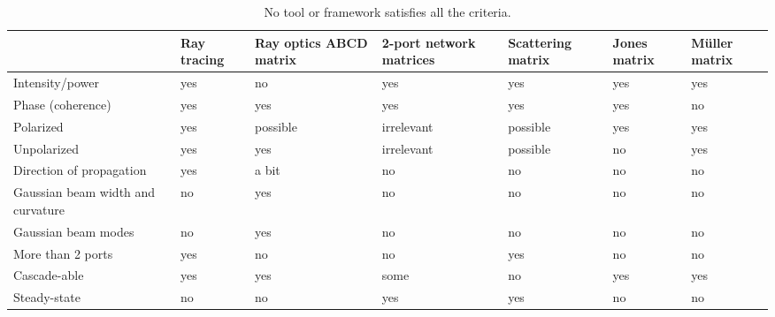 \begin{table}
    \centering
    {\footnotesize
    \begin{tabularx}{\textwidth}{X|X X X X X X}
        \toprule
                                          & Ray tracing & Ray optics ABCD matrix & 2-port network matrices & Scattering matrix & Jones matrix & Müller matrix  \\
        \midrule
        Intensity/power                   & yes         & no                     & yes                     & yes               & yes          & yes            \\
        Phase (coherence)                 & yes         & yes                    & yes                     & yes               & yes          & no             \\
        Polarized                         & yes         & possible               & irrelevant              & possible          & yes          & yes            \\
        Unpolarized                       & yes         & yes                    & irrelevant              & possible          & no           & yes            \\
        Direction of propagation          & yes         & a bit                  & no                      & no                & no           & no             \\
        Gaussian beam width and curvature & no          & yes                    & no                      & no                & no           & no             \\
        Gaussian beam modes               & no          & yes                    & no                      & no                & no           & no             \\
        More than 2 ports                 & yes         & no                     & no                      & yes               & no           & no             \\
        Cascade-able                      & yes         & yes                    & some                    & no                & yes          & yes            \\
        Steady-state                      & no          & no                     & yes                     & yes               & no           & no             \\
        \bottomrule
        \end{tabularx}
    }
    \caption{\label{tab:tools}No tool or framework satisfies all the criteria.}
\end{table}


